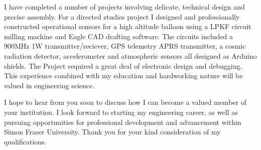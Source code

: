 \documentclass[11pt,a4paper,sans]{moderncv} %
\begin{document}
I have completed a number of projects involving delicate, technical design and precise assembly. For a directed studies project I designed and professionally constructed operational sensors for a high altitude balloon using a LPKF circuit milling machine and Eagle CAD drafting software. The circuits included a 900MHz 1W transmitter/reciever, GPS telemetry APRS transmitter, a cosmic radiation detector, accelerometer and atmospheric sensors all designed as Arduino shields. The Project required a great deal of electronic design and debugging. This experience combined with my education and hardworking nature will be valued in engineering science.

I hope to hear from you soon to discuss how I can become a valued member of your institution. I look forward to starting my engineering career, as well as pursuing opportunities for professional development and advancement within Simon Fraser University. Thank you for your kind consideration of my qualifications.

\makeletterclosing %

\end{document}
